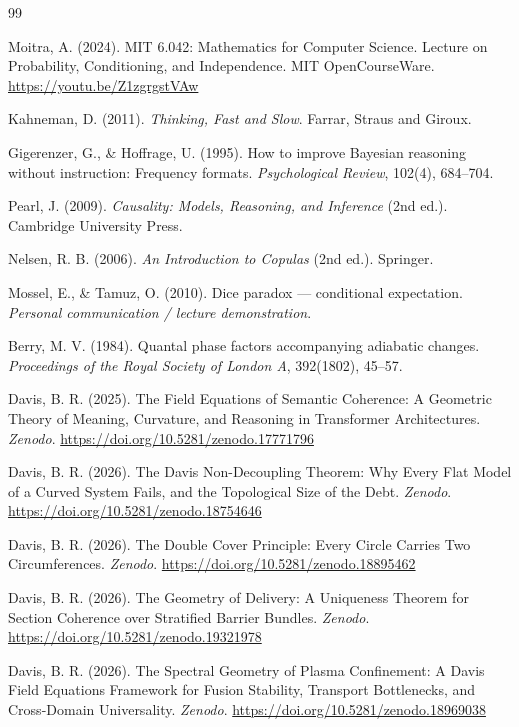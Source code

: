 \documentclass[12pt]{article}
\begin{document}
\begin{thebibliography}{99}

Moitra, A. (2024). MIT 6.042: Mathematics for Computer Science. Lecture on Probability, Conditioning, and Independence. MIT OpenCourseWare. \url{https://youtu.be/Z1zgrgstVAw}

Kahneman, D. (2011). \textit{Thinking, Fast and Slow}. Farrar, Straus and Giroux.

Gigerenzer, G., \& Hoffrage, U. (1995). How to improve Bayesian reasoning without instruction: Frequency formats. \textit{Psychological Review}, 102(4), 684--704.

Pearl, J. (2009). \textit{Causality: Models, Reasoning, and Inference} (2nd ed.). Cambridge University Press.

Nelsen, R. B. (2006). \textit{An Introduction to Copulas} (2nd ed.). Springer.

Mossel, E., \& Tamuz, O. (2010). Dice paradox --- conditional expectation. \textit{Personal communication / lecture demonstration}.

Berry, M. V. (1984). Quantal phase factors accompanying adiabatic changes. \textit{Proceedings of the Royal Society of London A}, 392(1802), 45--57.

Davis, B. R. (2025). The Field Equations of Semantic Coherence: A Geometric Theory of Meaning, Curvature, and Reasoning in Transformer Architectures. \textit{Zenodo}. \url{https://doi.org/10.5281/zenodo.17771796}

Davis, B. R. (2026). The Davis Non-Decoupling Theorem: Why Every Flat Model of a Curved System Fails, and the Topological Size of the Debt. \textit{Zenodo}. \url{https://doi.org/10.5281/zenodo.18754646}

Davis, B. R. (2026). The Double Cover Principle: Every Circle Carries Two Circumferences. \textit{Zenodo}. \url{https://doi.org/10.5281/zenodo.18895462}

Davis, B. R. (2026). The Geometry of Delivery: A Uniqueness Theorem for Section Coherence over Stratified Barrier Bundles. \textit{Zenodo}. \url{https://doi.org/10.5281/zenodo.19321978}

Davis, B. R. (2026). The Spectral Geometry of Plasma Confinement: A Davis Field Equations Framework for Fusion Stability, Transport Bottlenecks, and Cross-Domain Universality. \textit{Zenodo}. \url{https://doi.org/10.5281/zenodo.18969038}

\end{thebibliography}
\end{document}
